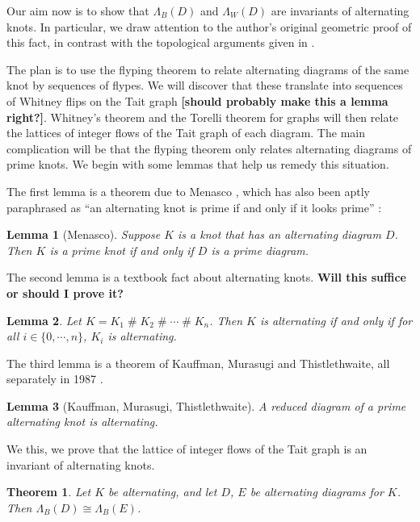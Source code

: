 \documentclass[12pt]{report}
\newcommand{\hash}{\ensuremath{\mathbin{\#}}}
\newcommand{\notered}[1]{{\color{Red} \textbf{#1}}}
\newtheorem*{theorem}{Theorem}
\newtheorem*{lemma}{Lemma}
\begin{document}
Our aim now is to show that $\Lambda_{B}(D)$ and $\Lambda_{W}(D)$ are invariants of alternating knots.  In particular, we draw attention to the author's original geometric proof of this fact, in contrast with the topological arguments given in \cite{lattices-graphs-mutation}.

The plan is to use the flyping theorem to relate alternating diagrams of the same knot by sequences of flypes.  We will discover that these translate into sequences of Whitney flips on the Tait graph \notered{[should probably make this a lemma right?]}. Whitney's theorem and the Torelli theorem for graphs will then relate the lattices of integer flows of the Tait graph of each diagram. The main complication will be that the flyping theorem only relates alternating diagrams of prime knots. We begin with some lemmas that help us remedy this situation.


The first lemma is a theorem due to Menasco \cite{closed-incompressible-surfaces}, which has also been aptly paraphrased as ``an alternating knot is prime if and only if it looks prime'' \cite{the-first-two-million-knots}:

\begin{lemma}[Menasco]
	Suppose $K$ is a knot that has an alternating diagram $D$. Then $K$ is a prime knot if and only if $D$ is a prime diagram.
\end{lemma}

The second lemma is a textbook fact about alternating knots. \notered{Will this suffice or should I prove it?}

\begin{lemma}
	Let $K = K_{1} \hash K_{2} \hash \cdots \hash K_{n}$. Then $K$ is alternating if and only if for all $i \in \{0, \cdots, n\}$, $K_{i}$ is alternating.
\end{lemma}

The third lemma is a theorem of Kauffman, Murasugi and Thistlethwaite, all separately in 1987 \cite{state-models-jones-polynomial, jones-polynomials-classical-conjectures, spanning-tree-expansion-jones-polynomial}.

\begin{lemma}[Kauffman, Murasugi, Thistlethwaite]
	A reduced diagram of a prime alternating knot is alternating.
\end{lemma}

We this, we prove that the lattice of integer flows of the Tait graph is an invariant of alternating knots.

\begin{theorem}
	Let $K$ be alternating, and let $D$, $E$ be alternating diagrams for $K$. Then $\Lambda_{B}(D) \cong \Lambda_{B}(E)$.
\end{theorem}
\end{document}
